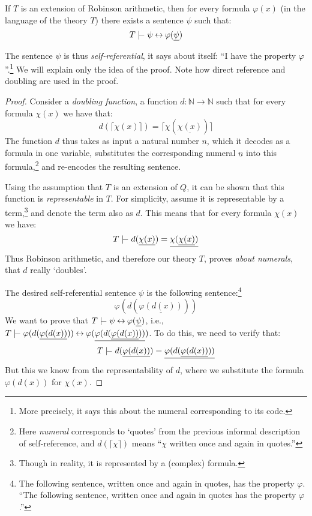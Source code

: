     \begin{theorem}
    If $T$ is an extension of Robinson arithmetic, then for every formula $\varphi(x)$ (in the language of the theory $T$) there exists a sentence $\psi$ such that:
    $$
    T\proves \psi \liff \varphi(\underline{\psi})
    $$
    \end{theorem}
    The sentence $\psi$ is thus \emph{self-referential}, it says about itself: ``I have the property $\varphi$''.\footnote{More precisely, it says this about the numeral corresponding to its code.} We will explain only the idea of the proof. Note how direct reference and doubling are used in the proof.
    \begin{proof} Consider a \emph{doubling function}, a function $d\colon\mathbb N\to\mathbb N$ such that for every formula $\chi(x)$ we have that:
    $$
    d(\lceil \chi(x)\rceil)=\lceil\chi(\underline{\chi(x)})\rceil
    $$
    The function $d$ thus takes as input a natural number $n$, which it decodes as a formula in one variable, substitutes the corresponding numeral $\underline{n}$ into this formula,\footnote{Here \emph{numeral} corresponds to `quotes' from the previous informal description of self-reference, and $d(\lceil\chi\rceil)$ means ``$\chi$ written once and again in quotes.''} and re-encodes the resulting sentence.
    
    Using the assumption that $T$ is an extension of $Q$, it can be shown that this function is \emph{representable} in $T$. For simplicity, assume it is representable by a term,\footnote{Though in reality, it is represented by a (complex) formula.} and denote the term also as $d$. This means that for every formula $\chi(x)$ we have:
    $$
    T\proves d(\underline{\chi(x)})=\underline{\chi(\underline{\chi(x)})}
    $$
    Thus Robinson arithmetic, and therefore our theory $T$, proves \emph{about numerals}, that $d$ really `doubles'.
    
    The desired self-referential sentence $\psi$ is the following sentence:\footnote{The following sentence, written once and again in quotes, has the property $\varphi$. ``The following sentence, written once and again in quotes has the property $\varphi$.''}
    $$
    \varphi(d(\underline{\varphi(d(x))}))
    $$
    We want to prove that $T\proves \psi \liff \varphi(\underline{\psi})$, i.e., $T \proves \varphi(d(\underline{\varphi(d(x))}))\liff\varphi(\underline{\varphi(d(\underline{\varphi(d(x))}))})$. To do this, we need to verify that:
    $$
    T \proves d(\underline{\varphi(d(x))})=\underline{\varphi(d(\underline{\varphi(d(x))}))}
    $$
    But this we know from the representability of $d$, where we substitute the formula $\varphi(d(x))$ for $\chi(x)$.
    \end{proof}
    
